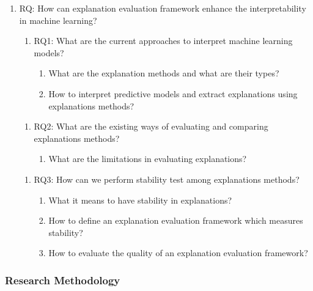 \documentclass[english]{tktltiki2}
\theoremstyle{definition}
\theoremstyle{remark}
\begin{document}
\begin{enumerate}
	\item RQ: How can explanation evaluation framework enhance the interpretability in machine learning?
	
	\begin{enumerate}\addtocounter{enumii}{0}
		\item RQ1: What are the current approaches to interpret machine learning models?
		\begin{enumerate}
			\item What are the explanation methods and what are their types?
			\item How to interpret predictive models and extract explanations using  explanations methods?
		\end{enumerate}
	\end{enumerate}
	
	\begin{enumerate}\addtocounter{enumii}{1}
		\item RQ2: What are the existing ways of evaluating and comparing explanations methods?
		\begin{enumerate}
			\item What are the limitations in evaluating explanations?
		\end{enumerate}
	\end{enumerate}
	
	\begin{enumerate}\addtocounter{enumii}{2}
		\item RQ3: How can we perform stability test among explanations methods?
		\begin{enumerate}
			\item What it means to have stability in explanations?
			\item How to define an explanation evaluation framework which measures stability?
			\item How to evaluate the quality of an explanation evaluation framework?
		\end{enumerate}
	\end{enumerate}
\end{enumerate}

\subsubsection{Research Methodology} %
\end{document}
